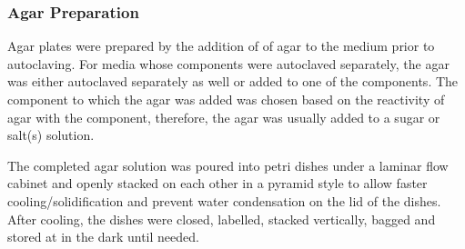 \subsubsection{Agar Preparation}
Agar plates were prepared by the addition of  of agar to the medium prior to autoclaving. For media whose components were autoclaved separately, the agar was either autoclaved separately as well or added to one of the components. The component to which the agar was added was chosen based on the reactivity of agar with the component, therefore, the agar was usually added to a sugar or salt(s) solution.

The completed agar solution was poured into petri dishes \cite{Petri1887} under a laminar flow cabinet and openly stacked on each other in a pyramid style to allow faster cooling/solidification and prevent water condensation on the lid of the dishes. After cooling, the dishes were closed, labelled, stacked vertically, bagged and stored at  in the dark until needed.

